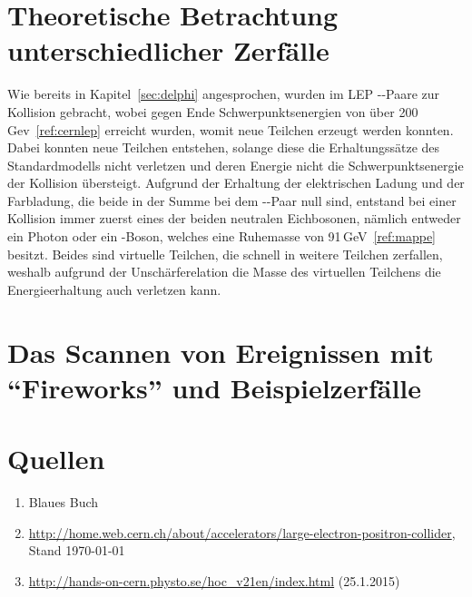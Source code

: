 \documentclass[a4paper,ngerman]{scrartcl}
\begin{document}
\section{Theoretische Betrachtung unterschiedlicher Zerfälle}
\label{sec:zerfaelle}

Wie bereits in Kapitel~\ref{sec:delphi} angesprochen, wurden im LEP \Pelectron-\APelectron-Paare zur Kollision gebracht, wobei gegen Ende Schwerpunktsenergien von über 200\,Gev~\ref{ref:cernlep} erreicht wurden,
womit neue Teilchen erzeugt werden konnten.
Dabei konnten neue Teilchen entstehen, 
solange diese die Erhaltungssätze des Standardmodells nicht verletzen 
und deren Energie nicht die Schwerpunktsenergie der Kollision übersteigt.
Aufgrund der Erhaltung der elektrischen Ladung und der Farbladung, 
die beide in der Summe bei dem \Pelectron-\APelectron-Paar null sind,
entstand bei einer Kollision immer zuerst eines der beiden neutralen Eichbosonen,
nämlich entweder ein Photon oder ein \PZzero-Boson,
welches eine Ruhemasse von 91\,GeV~\ref{ref:mappe} besitzt.
Beides sind virtuelle Teilchen, die schnell in weitere Teilchen zerfallen,
weshalb aufgrund der Unschärferelation die Masse des virtuellen Teilchens die Energieerhaltung auch verletzen kann.




\section{Das Scannen von Ereignissen mit "`Fireworks"' und Beispielzerfälle}
\label{sec:scannen}

\section{Quellen}
\begin{enumerate}
\item Blaues Buch \label{ref:BB}
\item \url{http://home.web.cern.ch/about/accelerators/large-electron-positron-collider}, Stand \today \label{ref:cernlep}
\item \url{http://hands-on-cern.physto.se/hoc_v21en/index.html} (25.1.2015)\label{ref:hands-on}
\end{enumerate}
\end{document}
